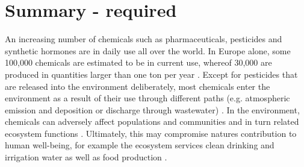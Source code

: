 \documentclass[journal,datadescriptor,accept,moreauthors,pdftex]{Definitions/mdpi}
\begin{document}


\section{Summary - required}
An increasing number of chemicals such as pharmaceuticals, pesticides and synthetic hormones are in daily use all over the world. In Europe alone, some 100,000 chemicals are estimated to be in current use, whereof 30,000 are produced in quantities larger than one ton per year \citep{breithaupt_costs_2006}. Except for pesticides that are released into the environment deliberately, most chemicals enter the environment as a result of their use through different paths (e.g. atmospheric emission and deposition or discharge through wastewater) \citep{schwarzenbach_challenge_2006}. In the environment, chemicals can adversely affect populations and communities and in turn related ecosystem functions \citep{schafer_thresholds_2012, malaj_organic_2014, hallmann_declines_2014, barracaracciolo_pharmaceuticals_2015, johnston_review_2015}. Ultimately, this may compromise natures contribution to human well-being, for example the ecosystem services clean drinking and irrigation water as well as food production \citep{peters_review_2013, vandersluijs_neonicotinoids_2013, yamamuro_neonicotinoids_2019}. 
\end{document}

